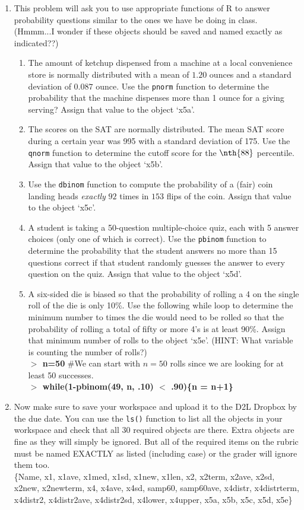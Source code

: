 \documentclass{article}
\newcommand{\Rin}[1]{\textbf{$>$ {#1}}}
\newcommand{\Rcom}[1]{\hspace{1cm} \#{#1}}
\begin{document}
\begin{enumerate}
\item This problem will ask you to use appropriate functions of R to answer probability questions similar to the ones we have be doing in class. (Hmmm...I wonder if these objects should be saved and named exactly as indicated??)
	\begin{enumerate}
	\item The amount of ketchup dispensed from a machine at a local convenience store is normally distributed with a mean of $1.20$ ounces and a standard deviation of $0.087$ ounce. Use the \texttt{pnorm} function to determine the probability that the machine dispenses more than 1 ounce for a giving serving? Assign that value to the object `x5a'.
	\item The scores on the SAT are normally distributed. The mean SAT score during a certain year was 995 with a standard deviation of 175. Use the \texttt{qnorm} function to determine the cutoff score for the $\nth{88}$ percentile. Assign that value to the object `x5b'.
	\item Use the \texttt{dbinom} function to compute the probability of a (fair) coin landing heads {\em exactly} $92$ times in $153$ flips of the coin. Assign that value to the object `x5c'.
	\item A student is taking a 50-question multiple-choice quiz, each with 5 answer choices (only one of which is correct). Use the \texttt{pbinom} function to determine the probability that the student answers no more than 15 questions correct if that student randomly guesses the answer to every question on the quiz. Assign that value to the object `x5d'.
	\item A six-sided die is biased so that the probability of rolling a 4 on the single roll of the die is only 10\%. Use the following while loop to determine the minimum number to times the die would need to be rolled so that the probability of rolling a total of fifty or more 4's is at least 90\%. Assign that minimum number of rolls to the object `x5e'. (HINT: What variable is counting the number of rolls?) \\
	\Rin{n=50} \Rcom{We can start with $n=50$ rolls since we are looking for at least 50 successes.} \\
	\Rin{while(1-pbinom(49, n, .10) $<$ .90)\{n = n+1\}}
	\end{enumerate}

\item Now make sure to save your workspace and upload it to the D2L Dropbox by the due date. You can use the \texttt{ls()} function to list all the objects in your workspace and check that all 30 required objects are there. Extra objects are fine as they will simply be ignored. But all of the required items on the rubric must be named EXACTLY as listed (including case) or the grader will ignore them too. \\
\{Name, x1, x1ave, x1med, x1sd, x1new, x1len, x2, x2term, x2ave, x2sd, x2new, x2newterm, x4, x4ave, x4sd, samp60, samp60ave, x4distr, x4distrterm, x4distr2, x4distr2ave, x4distr2sd, x4lower, x4upper, x5a, x5b, x5c, x5d, x5e\}

\end{enumerate}	
\end{document}
